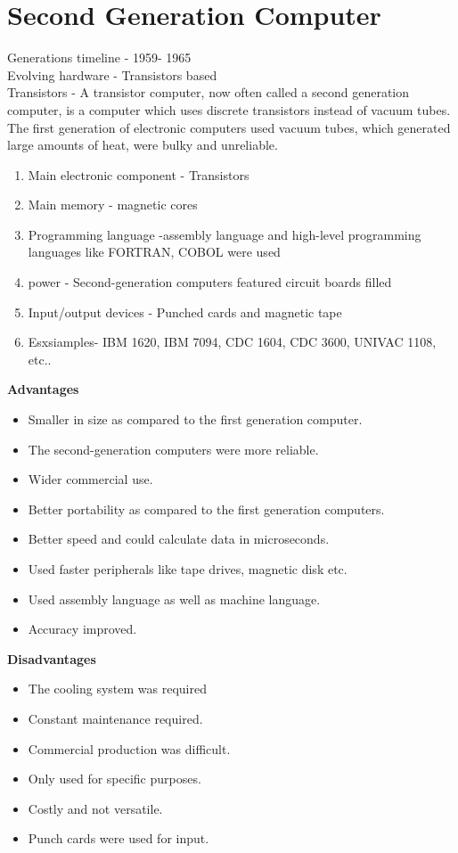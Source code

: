 \documentclass[a4paper,12pt]{article}
\begin{document}
\section{Second Generation Computer}
Generations timeline - 1959- 1965 \\
Evolving hardware - Transistors based \\
Transistors - A transistor computer, now often called a second generation computer, is a computer which uses discrete transistors instead of vacuum tubes. The first generation of electronic computers used vacuum tubes, which generated large amounts of heat, were bulky and unreliable.
\begin{enumerate}
\item Main electronic component - Transistors
\item Main memory - magnetic cores
\item Programming language -assembly language and high-level programming languages like FORTRAN, COBOL were used
\item power - Second-generation computers featured circuit boards filled 
\item Input/output devices - Punched cards and magnetic tape
\item Esxsiamples- IBM 1620, IBM 7094, CDC 1604, CDC 3600, UNIVAC 1108, etc..
\end{enumerate}

\textbf{Advantages} \\
\begin{itemize}
\item Smaller in size as compared to the first generation computer.
\item The second-generation computers were more reliable.
\item Wider commercial use.
\item Better portability as compared to the first generation computers.
\item Better speed and could calculate data in microseconds.
\item Used faster peripherals like tape drives, magnetic disk etc.
\item Used assembly language as well as machine language.
\item Accuracy improved.
\end{itemize}

\textbf{Disadvantages}
\begin{itemize}
\item The cooling system was required
\item Constant maintenance required.
\item Commercial production was difficult.
\item Only used for specific purposes.
\item Costly and not versatile.
\item Punch cards were used for input.
\end{itemize}
\end{document}
